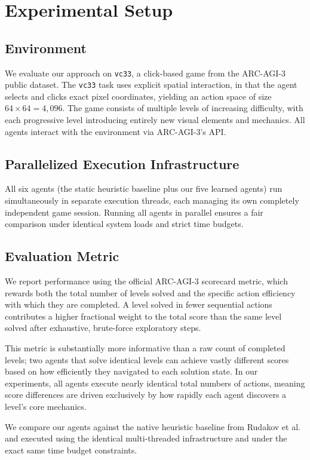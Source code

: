 \documentclass{article}
\begin{document}
\section{Experimental Setup}
\subsection{Environment}
We evaluate our approach on \texttt{vc33}, a click-based game from the ARC-AGI-3 public dataset. The \texttt{vc33} task uses explicit spatial interaction, in that the agent selects and clicks exact pixel coordinates, yielding an action space of size $64 \times 64 = 4{,}096$. The game consists of multiple levels of increasing difficulty, with each progressive level introducing entirely new visual elements and mechanics. All agents interact with the environment via ARC-AGI-3's API.

\subsection{Parallelized Execution Infrastructure}
All six agents (the static heuristic baseline plus our five learned agents) run simultaneously in separate execution threads, each managing its own completely independent game session.  Running all agents in parallel ensures a fair comparison under identical system loads and strict time budgets.

\subsection{Evaluation Metric}
We report performance using the official ARC-AGI-3 scorecard metric, which rewards both the total number of levels solved and the specific action efficiency with which they are completed. A level solved in fewer sequential actions contributes a higher fractional weight to the total score than the same level solved after exhaustive, brute-force exploratory steps. 

This metric is substantially more informative than a raw count of completed levels; two agents that solve identical levels can achieve vastly different scores based on how efficiently they navigated to each solution state. In our experiments, all agents execute nearly identical total numbers of actions, meaning score differences are driven exclusively by how rapidly each agent discovers a level's core mechanics.

We compare our agents against the native heuristic baseline from Rudakov et al. and executed using the identical multi-threaded infrastructure and under the exact same time budget constraints.
\end{document}
